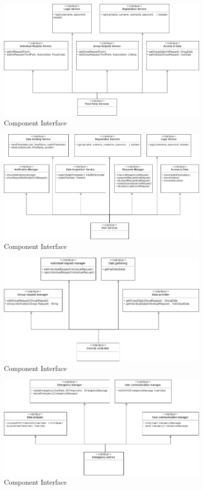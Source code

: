 \begin{figure}
    \centering
    \includegraphics[width=300pt]{images/CompInterfaces/Component_interfaces3.png}
    \caption{Component Interface}
\end{figure}

\begin{figure}
    \centering
    \includegraphics[width=300pt]{images/CompInterfaces/Component_interfaces4.png}
    \caption{Component Interface}
\end{figure}


\begin{figure}
    \centering
    \includegraphics[width=300pt]{images/CompInterfaces/Component_interfaces1.png}
    \caption{Component Interface}
\end{figure}

\begin{figure}
    \centering
    \includegraphics[width=300pt]{images/CompInterfaces/Component_interfaces2.png}
    \caption{Component Interface}
\end{figure}



